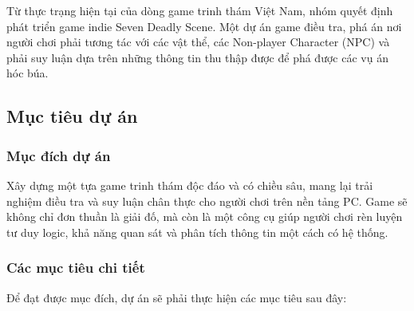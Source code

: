 Từ thực trạng hiện tại của dòng game trinh thám Việt Nam, nhóm quyết định phát triển game indie Seven Deadly Scene. 
Một dự án game điều tra, phá án nơi người chơi phải tương tác với các vật thể, các Non-player Character (NPC) và phải suy luận dựa trên những thông tin thu thập được để phá được các vụ án hóc búa. 

\subsection{Mục tiêu dự án}
\subsubsection{Mục đích dự án}
Xây dựng một tựa game trinh thám độc đáo và có chiều sâu, mang lại trải nghiệm điều tra và suy luận chân thực cho người chơi trên nền tảng PC. Game sẽ không chỉ đơn thuần là giải đố, mà còn là một công cụ giúp người chơi rèn luyện tư duy logic, khả năng quan sát và phân tích thông tin một cách có hệ thống.

\subsubsection{Các mục tiêu chi tiết}
Để đạt được mục đích, dự án sẽ phải thực hiện các mục tiêu sau đây:

